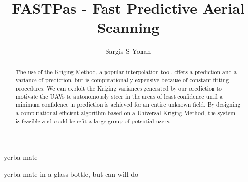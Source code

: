 \documentclass[11pt]{ucthesis}
\begin{document}

\title{FASTPas - Fast Predictive Aerial Scanning}
\author{Sargis S Yonan}
\deanlinethree{}

\begin{frontmatter}

\maketitle
\copyrightpage

\tableofcontents
\listoffigures
\listoftables

\begin{abstract}
The use of the Kriging Method, a popular interpolation tool, offers a prediction and a variance of prediction, but is computationally expensive because of constant fitting procedures. We can exploit the Kriging variances generated by our prediction to motivate the UAVs to autonomously steer in the areas of least confidence until a minimum confidence in prediction is achieved for an entire unknown field. By designing a computational efficient algorithm based on a Universal Kriging Method, the system is feasible and could benefit a large group of potential users.
\end{abstract}

\begin{dedication}
\null\vfil
{\large
\begin{center}
yerba mate
\vspace{12pt}
\end{center}}
\vfil\null
\end{dedication}


\begin{acknowledgements}
yerba mate in a glass bottle, but can will do
\end{acknowledgements}

\end{frontmatter}
\end{document}
